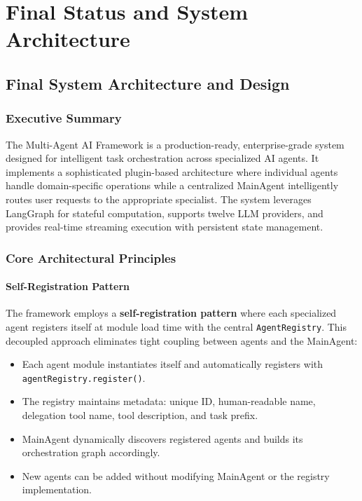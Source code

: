 \documentclass[11pt,a4paper]{report}
\newcommand{\code}[1]{\texttt{\small #1}}
\begin{document}
\clearpage
{}

\chapter{Final Status and System Architecture}

\section{Final System Architecture and Design}

\subsection{Executive Summary}

The Multi-Agent AI Framework is a production-ready, enterprise-grade system
designed for intelligent task orchestration across specialized AI agents. It
implements a sophisticated plugin-based architecture where individual agents
handle domain-specific operations while a centralized MainAgent intelligently
routes user requests to the appropriate specialist. The system leverages
LangGraph for stateful computation, supports twelve LLM providers, and
provides real-time streaming execution with persistent state management.

\subsection{Core Architectural Principles}

\subsubsection{Self-Registration Pattern}

The framework employs a \textbf{self-registration pattern} where each
specialized agent registers itself at module load time with the central
\code{AgentRegistry}. This decoupled approach eliminates tight coupling
between agents and the MainAgent:

\begin{itemize}
  \item Each agent module instantiates itself and automatically registers with \code{agent\-Registry.\allowbreak register()}.
  \item The registry maintains metadata: unique ID, human-readable name, delegation tool name, tool description, and task prefix.
  \item MainAgent dynamically discovers registered agents and builds its orchestration graph accordingly.
  \item New agents can be added without modifying MainAgent or the registry implementation.
\end{itemize}
\end{document}
